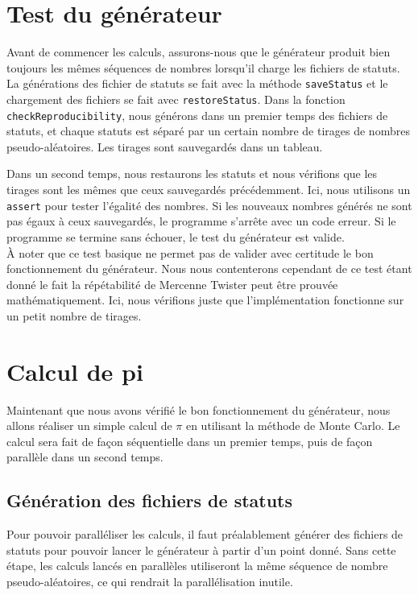 \documentclass[a4paper]{article}
\begin{document}
\section{Test du générateur}

Avant de commencer les calculs, assurons-nous que le générateur produit bien
toujours les mêmes séquences de nombres lorsqu'il charge les fichiers de
statuts.\\

La générations des fichier de statuts se fait avec la méthode
\lstinline{saveStatus} et le chargement des fichiers se fait avec
\lstinline{restoreStatus}. Dans la fonction \lstinline{checkReproducibility},
nous générons dans un premier temps des fichiers de statuts, et chaque statuts
est séparé par un certain nombre de tirages de nombres pseudo-aléatoires. Les
tirages sont sauvegardés dans un tableau.

Dans un second temps, nous restaurons les statuts et nous vérifions que les
tirages sont les mêmes que ceux sauvegardés précédemment. Ici, nous utilisons un
\lstinline{assert} pour tester l'égalité des nombres. Si les nouveaux nombres
générés ne sont pas égaux à ceux sauvegardés, le programme s'arrête avec un code
erreur. Si le programme se termine sans échouer, le test du générateur est
valide.\\

À noter que ce test basique ne permet pas de valider avec certitude le bon
fonctionnement du générateur. Nous nous contenterons cependant de ce test étant
donné le fait la répétabilité de Mercenne Twister peut être prouvée
mathématiquement. Ici, nous vérifions juste que l'implémentation fonctionne sur
un petit nombre de tirages.

\section{Calcul de pi}

Maintenant que nous avons vérifié le bon fonctionnement du générateur, nous
allons réaliser un simple calcul de $\pi$ en utilisant la méthode de Monte
Carlo. Le calcul sera fait de façon séquentielle dans un premier temps, puis de
façon parallèle dans un second temps.

\subsection{Génération des fichiers de statuts}

Pour pouvoir paralléliser les calculs, il faut préalablement générer des
fichiers de statuts pour pouvoir lancer le générateur à partir d'un point donné.
Sans cette étape, les calculs lancés en parallèles utiliseront la même séquence
de nombre pseudo-aléatoires, ce qui rendrait la parallélisation inutile.\\
\end{document}
